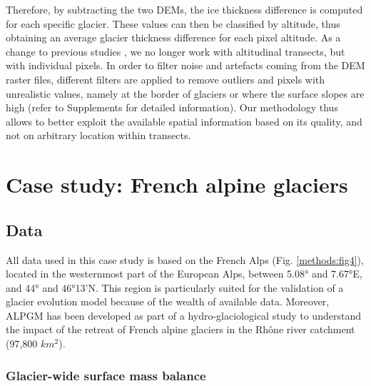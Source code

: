 Therefore, by subtracting the two DEMs, the ice thickness difference is computed for each specific glacier. These values can then be classified by altitude, thus obtaining an average glacier thickness difference for each pixel altitude. As a change to previous studies \citep{vincent_future_2014, huss_new_2015, hanzer_projected_2018, vincent_declin_2019}, we no longer work with altitudinal transects, but with individual pixels. In order to filter noise and artefacts coming from the DEM raster files, different filters are applied to remove outliers and pixels with unrealistic values, namely at the border of glaciers or where the surface slopes are high (refer to Supplements for detailed information). Our methodology thus allows to better exploit the available spatial information based on its quality, and not on arbitrary location within transects. 

\section{Case study: French alpine glaciers} \label{methods:case_study}
\subsection{Data} \label{methods:case_study:data}

All data used in this case study is based on the French Alps (Fig. \ref{methods:fig4}), located in the westernmost part of the European Alps, between 5.08° and 7.67°E, and 44° and 46°13’N. This region is particularly suited for the validation of a glacier evolution model because of the wealth of available data. Moreover, ALPGM has been developed as part of a hydro-glaciological study to understand the impact of the retreat of French alpine glaciers in the Rhône river catchment (97,800 \(km^2\)). 

\subsubsection{Glacier-wide surface mass balance }

